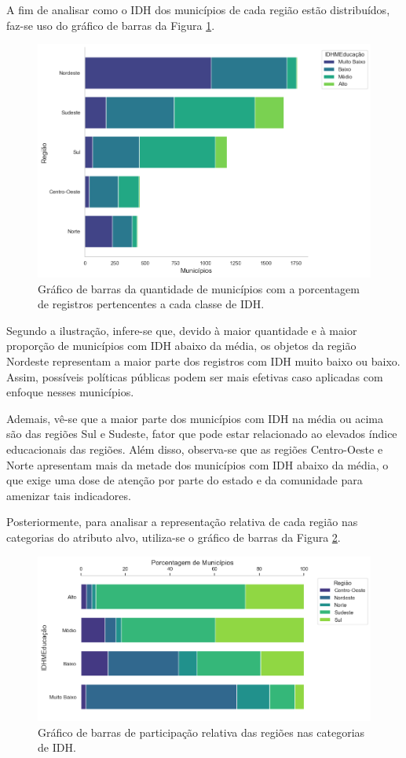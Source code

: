 \par A fim de analisar como o IDH dos municípios de cada região estão distribuídos, faz-se uso do gráfico de barras da Figura \ref{fig:bar-reg}.

\begin{figure}[H]
    \centering
    \includegraphics[width=0.75\linewidth]{Graphics/Bars-Regiao.png}
    \caption{Gráfico de barras da quantidade de municípios com a porcentagem de registros pertencentes a cada classe de IDH.}
    \label{fig:bar-reg}
\end{figure}

\par Segundo a ilustração, infere-se que, devido à maior quantidade e à maior proporção de municípios com IDH abaixo da média, os objetos da região Nordeste representam a maior parte dos registros com IDH muito baixo ou baixo. Assim, possíveis políticas públicas podem ser mais efetivas caso aplicadas com enfoque nesses municípios.

\par Ademais, vê-se que a maior parte dos municípios com IDH na média ou acima são das regiões Sul e Sudeste, fator que pode estar relacionado ao elevados índice educacionais das regiões. Além disso, observa-se que as regiões Centro-Oeste e Norte apresentam mais da metade dos municípios com IDH abaixo da média, o que exige uma dose de atenção por parte do estado e da comunidade para amenizar tais indicadores.

\par Posteriormente, para analisar a representação relativa de cada região nas categorias do atributo alvo, utiliza-se o gráfico de barras da Figura \ref{fig:bar-idh}.

\begin{figure}[H]
    \centering
    \includegraphics[width=0.75\linewidth]{Graphics/Bars-IDH.png}
    \caption{Gráfico de barras de participação relativa das regiões nas categorias de IDH.}
    \label{fig:bar-idh}
\end{figure}

